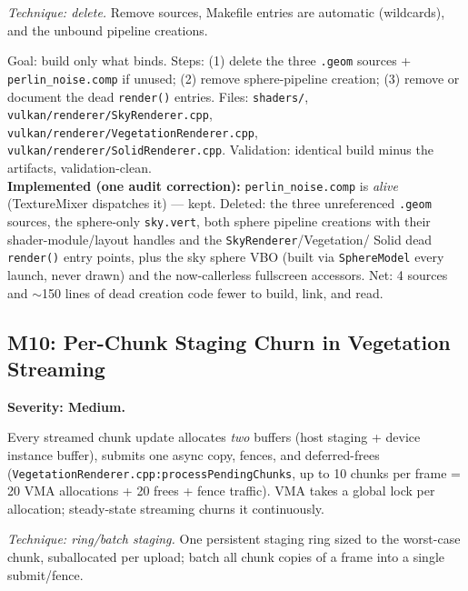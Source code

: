 \documentclass[11pt,a4paper]{article}
\begin{document}
\textit{Technique: delete.} Remove sources, Makefile entries are automatic
(wildcards), and the unbound pipeline creations.

\begin{tcolorbox}[promptbox={Prompt --- M9: delete the dead weight}]
Goal: build only what binds. Steps: (1) delete the three \texttt{.geom}
sources + \texttt{perlin\_noise.comp} if unused; (2) remove sphere-pipeline
creation; (3) remove or document the dead \texttt{render()} entries.
Files: \texttt{shaders/}, \texttt{vulkan/renderer/SkyRenderer.cpp},
\texttt{vulkan/renderer/VegetationRenderer.cpp},
\texttt{vulkan/renderer/SolidRenderer.cpp}. Validation: identical build
minus the artifacts, validation-clean.
\\ \textbf{Implemented (one audit correction):}
\texttt{perlin\_noise.comp} is \emph{alive} (TextureMixer dispatches it) ---
kept. Deleted: the three unreferenced \texttt{.geom} sources, the sphere-only
\texttt{sky.vert}, both sphere pipeline creations with their
shader-module/layout handles and the \texttt{SkyRenderer}/{Vegetation}/
{Solid} dead \texttt{render()} entry points, plus the sky sphere VBO (built
via \texttt{SphereModel} every launch, never drawn) and the now-callerless
fullscreen accessors. Net: 4 sources and $\sim$150 lines of dead creation
code fewer to build, link, and read.
\end{tcolorbox}

\subsection{M10: Per-Chunk Staging Churn in Vegetation Streaming}
\label{sec:m10}

\textbf{Severity: Medium.}

Every streamed chunk update allocates \emph{two} buffers (host staging +
device instance buffer), submits one async copy, fences, and deferred-frees
(\texttt{VegetationRenderer.cpp:processPendingChunks}, up to 10 chunks per
frame = 20 VMA allocations + 20 frees + fence traffic). VMA takes a global
lock per allocation; steady-state streaming churns it continuously.

\textit{Technique: ring/batch staging.} One persistent staging ring sized to
the worst-case chunk, suballocated per upload; batch all chunk copies of a
frame into a single submit/fence.
\end{document}
